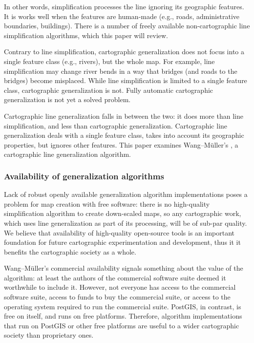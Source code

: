 \documentclass[a4paper]{article}
\newcommand{\titlecite}[1]{\citetitle{#1}\cite{#1}}
\newcommand{\WM}{Wang--M{\"u}ller}
\begin{document}
In other words, simplification processes the line ignoring its geographic
features. It is works well when the features are human-made (e.g., roads,
administrative boundaries, buildings). There is a number of freely available
non-cartographic line simplification algorithms, which this paper will review.

Contrary to line simplification, cartographic generalization does not focus
into a single feature class (e.g., rivers), but the whole map. For example,
line simplification may change river bends in a way that bridges (and roads to
the bridges) become misplaced. While line simplification is limited to a single
feature class, cartographic generalization is not. Fully automatic cartographic
generalization is not yet a solved problem. %

Cartographic line generalization falls in between the two: it does more than
line simplification, and less than cartographic generalization. Cartographic
line generalization deals with a single feature class, takes into account its
geographic properties, but ignores other features. This paper examines {\WM}'s
\titlecite{wang1998line}, a cartographic line generalization algorithm.

\subsubsection{Availability of generalization algorithms}

Lack of robust openly available generalization algorithm implementations poses
a problem for map creation with free software: there is no high-quality
simplification algorithm to create down-scaled maps, so any cartographic work,
which uses line generalization as part of its processing, will be of sub-par
quality. We believe that availability of high-quality open-source tools is an
important foundation for future cartographic experimentation and development,
thus it it benefits the cartographic society as a whole.

{\WM}'s commercial availability signals something about the value of the
algorithm: at least the authors of the commercial software suite deemed it
worthwhile to include it. However, not everyone has access to the commercial
software suite, access to funds to buy the commercial suite, or access to the
operating system required to run the commercial suite. PostGIS, in contrast, is
free on itself, and runs on free platforms. Therefore, algorithm
implementations that run on PostGIS or other free platforms are useful to a
wider cartographic society than proprietary ones.
\end{document}

